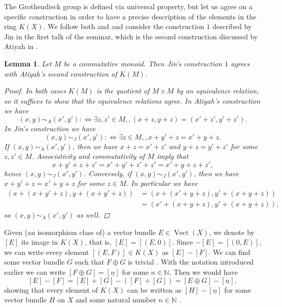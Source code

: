\documentclass[12pt,a4paper]{amsart}
\theoremstyle{plain}
\newtheorem{lm}[thm]{Lemma}
\theoremstyle{definition}
\theoremstyle{remark}
\begin{document}
The Grothendieck group is defined via universal property, but let us agree on a specific construction in order to have a precise description of the elements in the ring $K(X)$.
We follow both \cite{ati67} and \cite{hat03} and consider the construction $1$ described by Jin in the first talk of the seminar, which is the second construction discussed by Atiyah in \cite[p.~42]{ati67}.

\begin{lm}
  Let $M$ be a commutative monoid.
  Then Jin's construction $1$ agrees with Atiyah's second construction of $K(M)$.
  \begin{proof}
    In both cases $K(M)$ is the quotient of $M \times M$ by an equivalence relation, so it suffices to show that the equivalence relations agree.
    In Atiyah's construction we have
    \[ (x,y) \sim_{A} (x', y') : \Leftrightarrow \exists z , z' \in M,, (x + z, y + z) = (x' + z', y' + z'). \]
    In Jin's construction we have
    \[ (x,y) \sim_{J} (x', y') : \Leftrightarrow \exists z \in M,, x + y' + z = x' + y + z. \]
    If $(x, y) \sim_{A} (x', y')$, then we have $x + z = x' + z'$ and $y + z = y' + z'$ for some $z, z' \in M$. 
    Associativity and commutativity of $M$ imply that
    \[ x + y' + z + z' = x' + y' + z' + z' = x' + y + z + z', \]
    hence $(x, y) \sim_{J} (x', y')$.
    Conversely, if $(x, y) \sim_{J} (x', y')$, then we have $x + y' + z = x' + y + z$ for some $z \in M$.
    In particular we have
    \begin{align*}
      (x + (x + y' + z), y + (x + y' + z)) & = (x + (x' + y + z), y' + (x + y + z)) \\
      & = (x' + (x + y + z), y' + (x + y + z)),
    \end{align*}
    so $(x, y) \sim_{A} (x', y')$ as well.
  \end{proof}
\end{lm}

Given (an isomorphism class of) a vector bundle $E \in \operatorname{Vect}(X)$, we denote by $[E]$ its image in $K(X)$, that is, $[E] = [(E, 0)]$.
Since $-[E] = [(0,E)]$, we can write every element $[(E,F)] \in K(X)$ as $[E] - [F]$.
We can find some vector bundle $G$ such that $F \oplus G$ is trivial \cite[Corollary 1.4.14]{ati67}.
With the notation introduced earlier we can write $[F \oplus G] = [\underline{n}]$ for some $n \in \mathbb{N}$.
Then we would have
\[ [E] - [F] = [E] + [G] - ([F] + [G]) = [E \oplus G] - [\underline{n}], \]
showing that every element of $K(X)$ can be written as $[H] - [\underline{n}]$ for some vector bundle $H$ on $X$ and some natural number $n \in \mathbb{N}$ \cite[p.~44]{ati67}.
\end{document}
